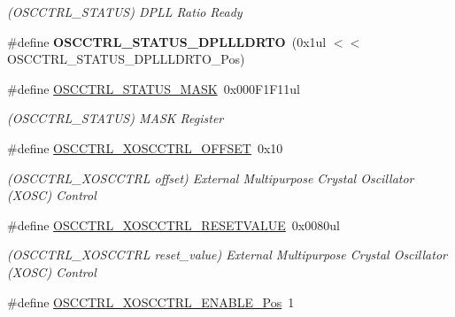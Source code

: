 \begin{DoxyCompactItemize}
\begin{DoxyCompactList}\small\item\em (O\+S\+C\+C\+T\+R\+L\+\_\+\+S\+T\+A\+T\+U\+S) D\+P\+L\+L Ratio Ready \end{DoxyCompactList}\item 
\hypertarget{group___s_a_m_l21___o_s_c_c_t_r_l_ga61f5e188eeb5a32fb3f34bc26260d21a}{}\#define {\bfseries O\+S\+C\+C\+T\+R\+L\+\_\+\+S\+T\+A\+T\+U\+S\+\_\+\+D\+P\+L\+L\+L\+D\+R\+T\+O}~(0x1ul $<$$<$ O\+S\+C\+C\+T\+R\+L\+\_\+\+S\+T\+A\+T\+U\+S\+\_\+\+D\+P\+L\+L\+L\+D\+R\+T\+O\+\_\+\+Pos)\label{group___s_a_m_l21___o_s_c_c_t_r_l_ga61f5e188eeb5a32fb3f34bc26260d21a}

\item 
\hypertarget{group___s_a_m_l21___o_s_c_c_t_r_l_ga9f82ecd17b8fa59428ef3e31aea63aa6}{}\#define \hyperlink{group___s_a_m_l21___o_s_c_c_t_r_l_ga9f82ecd17b8fa59428ef3e31aea63aa6}{O\+S\+C\+C\+T\+R\+L\+\_\+\+S\+T\+A\+T\+U\+S\+\_\+\+M\+A\+S\+K}~0x000\+F1\+F11ul\label{group___s_a_m_l21___o_s_c_c_t_r_l_ga9f82ecd17b8fa59428ef3e31aea63aa6}

\begin{DoxyCompactList}\small\item\em (O\+S\+C\+C\+T\+R\+L\+\_\+\+S\+T\+A\+T\+U\+S) M\+A\+S\+K Register \end{DoxyCompactList}\item 
\hypertarget{group___s_a_m_l21___o_s_c_c_t_r_l_gab61ec167eaec3b37ce0a5e09811eb519}{}\#define \hyperlink{group___s_a_m_l21___o_s_c_c_t_r_l_gab61ec167eaec3b37ce0a5e09811eb519}{O\+S\+C\+C\+T\+R\+L\+\_\+\+X\+O\+S\+C\+C\+T\+R\+L\+\_\+\+O\+F\+F\+S\+E\+T}~0x10\label{group___s_a_m_l21___o_s_c_c_t_r_l_gab61ec167eaec3b37ce0a5e09811eb519}

\begin{DoxyCompactList}\small\item\em (O\+S\+C\+C\+T\+R\+L\+\_\+\+X\+O\+S\+C\+C\+T\+R\+L offset) External Multipurpose Crystal Oscillator (X\+O\+S\+C) Control \end{DoxyCompactList}\item 
\hypertarget{group___s_a_m_l21___o_s_c_c_t_r_l_ga1e702ca999cd2ea9e938976d66e4d5e8}{}\#define \hyperlink{group___s_a_m_l21___o_s_c_c_t_r_l_ga1e702ca999cd2ea9e938976d66e4d5e8}{O\+S\+C\+C\+T\+R\+L\+\_\+\+X\+O\+S\+C\+C\+T\+R\+L\+\_\+\+R\+E\+S\+E\+T\+V\+A\+L\+U\+E}~0x0080ul\label{group___s_a_m_l21___o_s_c_c_t_r_l_ga1e702ca999cd2ea9e938976d66e4d5e8}

\begin{DoxyCompactList}\small\item\em (O\+S\+C\+C\+T\+R\+L\+\_\+\+X\+O\+S\+C\+C\+T\+R\+L reset\+\_\+value) External Multipurpose Crystal Oscillator (X\+O\+S\+C) Control \end{DoxyCompactList}\item 
\hypertarget{group___s_a_m_l21___o_s_c_c_t_r_l_ga55753823c79f012a07776d32fb431e50}{}\#define \hyperlink{group___s_a_m_l21___o_s_c_c_t_r_l_ga55753823c79f012a07776d32fb431e50}{O\+S\+C\+C\+T\+R\+L\+\_\+\+X\+O\+S\+C\+C\+T\+R\+L\+\_\+\+E\+N\+A\+B\+L\+E\+\_\+\+Pos}~1\label{group___s_a_m_l21___o_s_c_c_t_r_l_ga55753823c79f012a07776d32fb431e50}


\end{DoxyCompactItemize}
